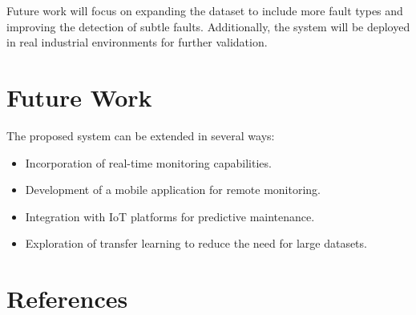 \documentclass[conference]{IEEEtran}
\begin{document}
Future work will focus on expanding the dataset to include more fault types and improving the detection of subtle faults. Additionally, the system will be deployed in real industrial environments for further validation.

\section{Future Work}

The proposed system can be extended in several ways:
\begin{itemize}
    \item Incorporation of real-time monitoring capabilities.
    \item Development of a mobile application for remote monitoring.
    \item Integration with IoT platforms for predictive maintenance.
    \item Exploration of transfer learning to reduce the need for large datasets.
\end{itemize}

\section{References}



\end{document}

